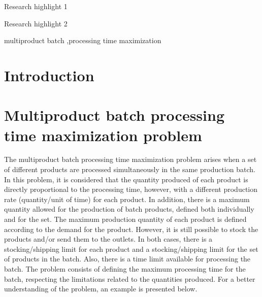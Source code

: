 \documentclass[preprint,12pt,authoryear]{elsarticle}
\begin{document}
\begin{frontmatter}
\begin{highlights}
\item Research highlight 1
\item Research highlight 2
\end{highlights}

\begin{keyword}
multiproduct batch \sep processing time maximization



\end{keyword}

\end{frontmatter}


\section{Introduction}
\label{}

\section{Multiproduct batch processing time maximization problem}
\label{sec:MBPTMP}

The multiproduct batch processing time maximization problem arises when a set of different products are processed simultaneously in the same production batch. In this problem, it is considered that the quantity produced of each product is directly proportional to the processing time, however, with a different production rate (quantity/unit of time) for each product. In addition, there is a maximum quantity allowed for the production of batch products, defined both individually and for the set. The maximum production quantity of each product is defined according to the demand for the product. However, it is still possible to stock the products and/or send them to the outlets. In both cases, there is a stocking/shipping limit for each product and a stocking/shipping limit for the set of products in the batch. Also, there is a time limit available for processing the batch. The problem consists of defining the maximum processing time for the batch, respecting the limitations related to the quantities produced. For a better understanding of the problem, an example is presented below.
\end{document}
